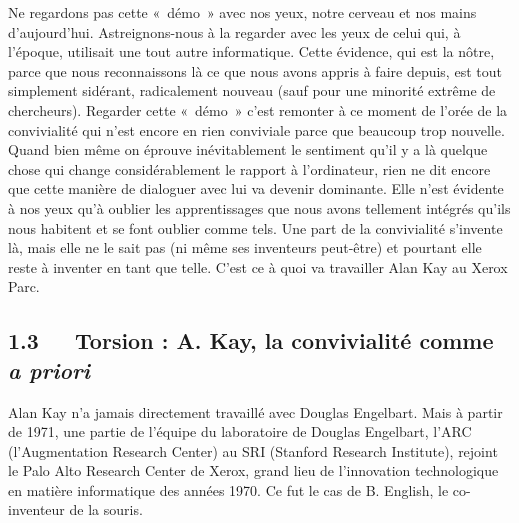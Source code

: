 \documentclass{FramateX}
\begin{document}
\begin{refsection}
Ne regardons pas cette «~démo~» avec nos yeux, notre cerveau et nos mains
d'aujourd'hui. Astreignons-nous à la regarder avec les yeux de celui
qui, à l'époque, utilisait une tout autre informatique. Cette évidence,
qui est la nôtre, parce que nous reconnaissons là ce que nous avons
appris à faire depuis, est tout simplement sidérant, radicalement
nouveau (sauf pour une minorité extrême de chercheurs).
Regarder cette «~démo~» c'est remonter à ce moment de l'orée de la
convivialité qui n'est encore en rien conviviale parce que beaucoup
trop nouvelle. Quand bien même on éprouve inévitablement le sentiment
qu'il y a là quelque chose qui change considérablement le rapport à
l'ordinateur, rien ne dit encore que cette manière de dialoguer avec
lui va devenir dominante. Elle n'est évidente à nos yeux qu'à oublier
les apprentissages que nous avons tellement intégrés qu'ils nous
habitent et se font oublier comme tels. Une part de la convivialité
s'invente là, mais elle ne le sait pas (ni même ses inventeurs peut-être) et pourtant elle reste à inventer en tant que telle. C'est ce à
quoi va travailler Alan Kay au Xerox Parc.


\subsection*{1.3~~~Torsion : A. Kay, la convivialité comme \textit{a priori}}
{}

Alan Kay n'a jamais directement travaillé avec Douglas Engelbart. Mais à partir de 1971, une partie de l'équipe du laboratoire de Douglas Engelbart, l'ARC
(l'Augmentation Research Center) au SRI (Stanford Research Institute), 
rejoint le Palo Alto Research Center de Xerox, grand lieu de l'innovation technologique en matière
informatique des années 1970. Ce fut le cas de B. English, le co-inventeur de la
souris.


\end{refsection}
\end{document}
